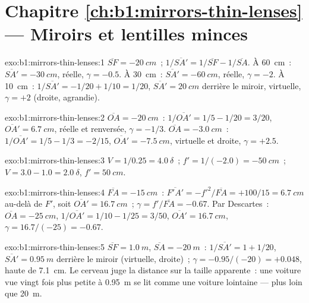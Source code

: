 \section*{Chapitre \ref{ch:b1:mirrors-thin-lenses} --- Miroirs et lentilles minces}

\begin{solution}{exo:b1:mirrors-thin-lenses:1}
$\overline{SF} = \qty{-20}{cm}$~; $1/\overline{SA'} = 1/\overline{SF} -
1/\overline{SA}$. À \qty{60}{cm}~: $\overline{SA'} = \qty{-30}{cm}$,
réelle, $\gamma = -0.5$. À \qty{30}{cm}~: $\overline{SA'} = \qty{-60}{cm}$,
réelle, $\gamma = -2$. À \qty{10}{cm}~: $1/\overline{SA'} = -1/20 + 1/10
= 1/20$, $\overline{SA'} = \qty{+20}{cm}$ derrière le miroir, virtuelle,
$\gamma = +2$ (droite, agrandie).
\end{solution}

\begin{solution}{exo:b1:mirrors-thin-lenses:2}
$\overline{OA} = \qty{-20}{cm}$~: $1/\overline{OA'} = 1/5 - 1/20 = 3/20$,
$\overline{OA'} = \qty{+6.7}{cm}$, réelle et renversée, $\gamma = -1/3$.
$\overline{OA} = \qty{-3.0}{cm}$~: $1/\overline{OA'} = 1/5 - 1/3 = -2/15$,
$\overline{OA'} = \qty{-7.5}{cm}$, virtuelle et droite, $\gamma = +2.5$.
\end{solution}

\begin{solution}{exo:b1:mirrors-thin-lenses:3}
$V = 1/0.25 = \qty{+4.0}{\delta}$~; $f' = 1/(-2.0) = \qty{-50}{cm}$~;
$V = 3.0 - 1.0 = \qty{+2.0}{\delta}$, $f' = \qty{50}{cm}$.
\end{solution}

\begin{solution}{exo:b1:mirrors-thin-lenses:4}
$\overline{FA} = \qty{-15}{cm}$~: $\overline{F'A'} = -f'^2/\overline{FA}
= +100/15 = \qty{6.7}{cm}$ au-delà de $F'$, soit $\overline{OA'} = \qty{16.7}{cm}$~;
$\gamma = f'/\overline{FA} = -0.67$. Par Descartes~: $\overline{OA} =
\qty{-25}{cm}$, $1/\overline{OA'} = 1/10 - 1/25 = 3/50$,
$\overline{OA'} = \qty{16.7}{cm}$, $\gamma = 16.7/(-25) = -0.67$.
\end{solution}

\begin{solution}{exo:b1:mirrors-thin-lenses:5}
$\overline{SF} = \qty{+1.0}{m}$, $\overline{SA} = \qty{-20}{m}$~:
$1/\overline{SA'} = 1 + 1/20$, $\overline{SA'} = \qty{0.95}{m}$ derrière
le miroir (virtuelle, droite)~; $\gamma = -0.95/(-20) = +0.048$, 
haute de \qty{7.1}{cm}. Le cerveau juge la distance sur la taille
apparente~: une voiture vue vingt fois plus petite à \qty{0.95}{m} se lit
comme une voiture lointaine --- plus loin que \qty{20}{m}.
\end{solution}

